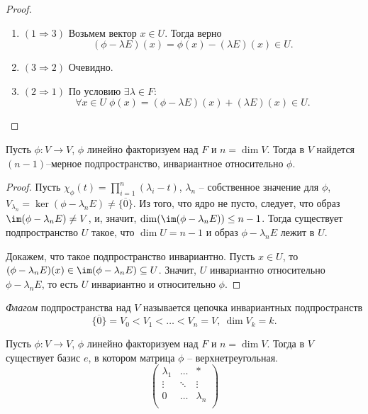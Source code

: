\begin{proof}~
    \begin{enumerate}
        \item $(1 \Rightarrow 3)$ Возьмем вектор $x \in U$. Тогда верно
        $$(\phi - \lambda E)(x) = \phi(x) - (\lambda E)(x) \in U.$$
        \item $(3 \Rightarrow 2)$ Очевидно.
        \item $(2 \Rightarrow 1)$ По условию $\exists \lambda \in F:$
        $$\forall x \in U \; \phi(x) = (\phi - \lambda E)(x) + (\lambda E)(x) \in U.$$
    \end{enumerate}
\end{proof}

\begin{proposition}
    \label{utv4.3}
    Пусть $\phi: V \to V$, $\phi$ линейно факторизуем над $F$ и  $n = \dim V$. Тогда в $V$ найдется 
    $(n - 1)$--мерное подпространство, инвариантное относительно $\phi$.
\end{proposition}

\begin{proof}
    Пусть $\chi_{\phi}(t) = \prod_{i=1}^n (\lambda_i - t)$, $\lambda_n$ -- собственное значение для $\phi$, 
    $V_{\lambda_n} = \ker (\phi - \lambda_n E) \neq \{ \overline{0} \}$. Из того, что ядро не пусто, 
    следует, что образ $\im(\phi - \lambda_n E) \neq V$, и, значит, $\dim (\im(\phi - \lambda_n E)) \leq n - 1$. 
    Тогда существует подпространство $U$ такое, что $\dim U = n - 1$ и образ $\phi - \lambda_n E$ лежит в $U$. 
    
    Докажем, что такое подпространство инвариантно. Пусть $x \in U$, то $(\phi - \lambda_n E)(x) \in \im(\phi - \lambda_n E) \subseteq U$. 
    Значит, $U$ инвариантно относительно $\phi - \lambda_n E$, то есть $U$ инвариантно и относительно $\phi$.
\end{proof}

\begin{definition}
    \textit{Флагом} подпространства над $V$ называется цепочка инвариантных подпространств 
    $$\{ \overline{0} \} = V_0 < V_1 < \ldots < V_n = V, \ \dim V_k = k.$$
\end{definition}

\begin{theorem}
    Пусть $\phi: V \to V$, $\phi$ линейно факторизуем над $F$ и  $n = \dim V$. Тогда в $V$ существует базис $e$, в котором матрица $\phi$ -- верхнетреугольная.
    \begin{equation*}
        \left(
            \begin{array}{ccc}
            \lambda_1 & \dots & * \\
            \vdots & \ddots & \vdots \\
            0 & \dots & \lambda_n \\
            \end{array}
        \right)
    \end{equation*}
\end{theorem}

